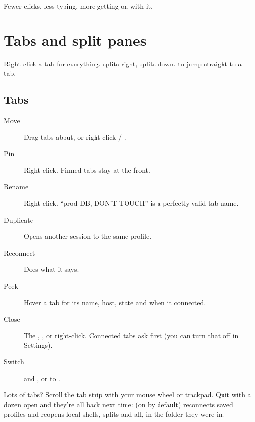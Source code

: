   {Fewer clicks, less typing, more getting on with it.}
  {
   }

\chapter{Tabs and split panes}\label{ch:tabs}

\begin{tldr}
Right-click a tab for everything.  splits right,  splits down.
 to  jump straight to a tab.
\end{tldr}

\section{Tabs}

\begin{description}
  \item[Move] Drag tabs about, or right-click\then{} / .
  \item[Pin] Right-click\then{}. Pinned tabs stay at the front.
  \item[Rename] Right-click\then{}. ``prod DB, DON'T TOUCH'' is a perfectly valid tab name.
  \item[Duplicate] Opens another session to the same profile.
  \item[Reconnect] Does what it says.
  \item[Peek] Hover a tab for its name, host, state and when it connected.
  \item[Close] The , , or right-click\then{}. Connected tabs ask first (you can turn that
        off in Settings).
  \item[Switch]  and , or  to .
\end{description}

Lots of tabs? Scroll the tab strip with your mouse wheel or trackpad. Quit with a dozen open and they're all back next
time:  (on by default) reconnects saved profiles and reopens local shells, splits and all,
in the folder they were in.

